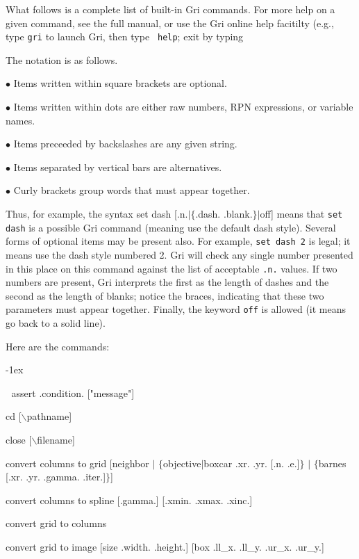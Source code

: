 What follows is a complete list of built-in Gri commands.  For more
help on a given command, see the full manual, or use the Gri online
help facitilty (e.g., type {\tt gri} to launch Gri, then type {\tt
help}; exit by typing

The notation is as follows.  

$\bullet$ Items written within square brackets are optional.

$\bullet$ Items written within dots are either raw numbers, RPN
expressions, or variable names.

$\bullet$ Items preceeded by backslashes are any given string.

$\bullet$ Items separated by vertical bars are alternatives.

$\bullet$ Curly brackets group words that must appear together.

Thus, for example, the syntax
\beginexample
    set dash [.n.$\mid$$\lbrace$.dash. .blank.$\rbrace$$\mid$off]
\endexample
means that {\tt set dash} is a possible Gri command (meaning use the
default dash style).  Several forms of optional items may be present
also.  For example, {\tt set dash 2} is legal; it means use the dash
style numbered 2.  Gri will check any single number presented in this
place on this command against the list of acceptable {\tt .n.} values.
If two numbers are present, Gri interprets the first as the length of
dashes and the second as the length of blanks; notice the braces,
indicating that these two parameters must appear together.  Finally,
the keyword {\tt off} is allowed (it means go back to a solid line).


\bigskip
Here are the commands:
\smallskip

\parindent -1ex

\beginexample


assert .condition. ["message"]

cd [$\backslash$pathname]

close [$\backslash$filename]

convert columns to grid [neighbor $\mid$ $\lbrace$objective$\mid$boxcar .xr. .yr. [.n. .e.]$\rbrace$ $\mid$ $\lbrace$barnes [.xr. .yr. .gamma. .iter.]$\rbrace$]

convert columns to spline [.gamma.] [.xmin. .xmax. .xinc.]

convert grid to columns

convert grid to image [size .width. .height.] [box .ll\_x. .ll\_y. .ur\_x. .ur\_y.]

